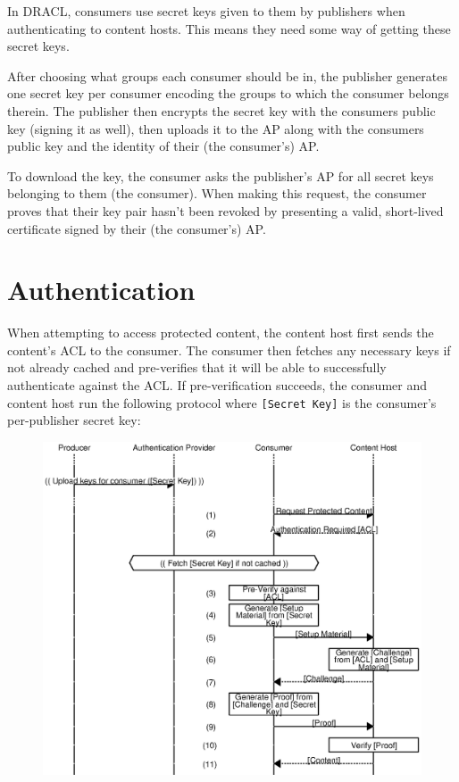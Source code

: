 \documentclass[pdftex,12pt,a4papaer]{report}
\begin{document}
In DRACL, consumers use secret keys given to them by publishers when
authenticating to content hosts. This means they need some way of getting these
secret keys.

After choosing what groups each consumer should be in, the publisher generates
one secret key per consumer encoding the groups to which the consumer belongs
therein. The publisher then encrypts the secret key with the consumers public
key (signing it as well), then uploads it to the AP along with the consumers
public key and the identity of their (the consumer's) AP.

To download the key, the consumer asks the publisher's AP for all secret keys
belonging to them (the consumer). When making this request, the consumer proves
that their key pair hasn't been revoked by presenting a valid, short-lived
certificate signed by their (the consumer's) AP.

\section{Authentication}
\label{sub:authentication}

When attempting to access protected content, the content host first sends the
content's ACL to the consumer. The consumer then fetches any necessary keys if
not already cached and pre-verifies that it will be able to successfully
authenticate against the ACL. If pre-verification succeeds, the consumer and
content host run the following protocol where \verb=[Secret Key]= is the
consumer's per-publisher secret key:

\begin{figure}[H]
    \includegraphics{auth.eps}
\end{figure}
\end{document}
